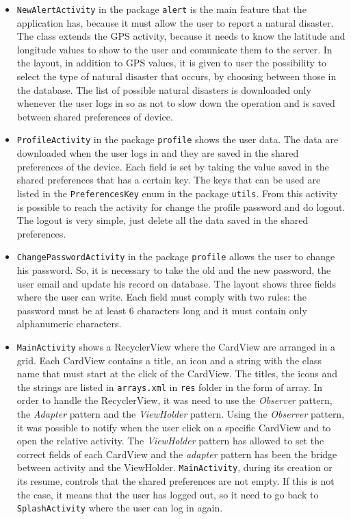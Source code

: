 \documentclass[a4paper,12pt]{report}
\begin{document}
\begin{itemize}
\item \texttt{NewAlertActivity} in the package \texttt{alert} is the main feature that the application has, because it must allow the user to report a natural disaster. The class extends the GPS activity, because it needs to know the latitude and longitude values to show to the user and comunicate them to the server. In the layout, in addition to GPS values, it is given to user the possibility to select the type of natural disaster that occurs, by choosing between those in the database. The list of possible natural disasters is downloaded only whenever the user logs in so as not to slow down the operation and is saved between shared preferences of device.
\item \texttt{ProfileActivity} in the package \texttt{profile} shows the user data. The data are downloaded when the user logs in and they are saved in the shared preferences of the device. Each field is set by taking the value saved in the shared preferences that has a certain key. The keys that can be used are listed in the \texttt{PreferencesKey} enum in the package \texttt{utils}. From this activity is possible to reach the activity for change the profile password and do logout. The logout is very simple, just delete all the data saved in the shared preferences.
\item \texttt{ChangePasswordActivity} in the package \texttt{profile} allows the user to change his password. So, it is necessary to take the old and the new password, the user email and update his record on database. The layout shows three fields where the user can write. Each field must comply with two rules: the password must be at least 6 characters long and it must contain only alphanumeric characters.
\item \texttt{MainActivity} shows a RecyclerView where the CardView are arranged in a grid. Each CardView contains a title, an icon and a string with the class name that must start at the click of the CardView. The titles, the icons and the strings are listed in \texttt{arrays.xml} in \texttt{res} folder in the form of array. In order to handle the RecyclerView, it was need to use the \emph{Observer} pattern, the \emph{Adapter} pattern and the \emph{ViewHolder} pattern. Using the \emph{Observer} pattern, it was possible to notify when the user click on a specific CardView and to open the relative activity. The \emph{ViewHolder} pattern has allowed to set the correct fields of each CardView and the \emph{adapter} pattern has been the bridge between activity and the ViewHolder. \texttt{MainActivity}, during its creation or its resume, controls that the shared preferences are not empty. If this is not the case, it means that the user has logged out, so it need to go back to \texttt{SplashActivity} where the user can log in again.
\end{itemize}
\end{document}
